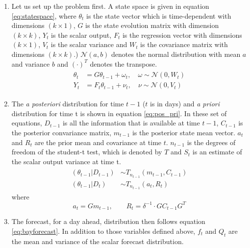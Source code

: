 \begin{enumerate}
\item Let us set up the problem first. A state space is given in equation \ref{eq:statespace}, where $\theta_t$ is the state vector which is time-dependent with dimensions $(k \times 1)$, $G$ is the state evolution matrix with dimension $(k \times k)$, $Y_t$ is the scalar output, $F_t$ is the regression vector with dimensions $(k \times 1)$, $V_t$ is the scalar variance and $W_t$ is the covariance matrix with dimensions $(k \times k)$.) $\mathscr{N}(a,b)$ denotes the normal distribution with mean $a$ and variance $b$ and $(\cdot)^T$ denotes the transpose.
\begin{align} \label{eq:statespace}
\begin{split}
\theta_t &= G\theta_{t-1} + \omega_t, \quad \omega \sim \mathscr{N}(0,W_t) \\
Y_t &= F_t\theta_{t-1} + \nu_t, \quad \nu \sim \mathscr{N}(0,V_t)
\end{split}
\end{align}
%
\item The \textit{a posteriori} distribution for time $t-1$ ($t$ is in days) and \textit{a priori} distribution for time t is shown in equation \ref{eq:pos_pri}. In these set of equations, $D_{t-1}$ is all the information that is available at time $t-1$, $C_{t-1}$ is the posterior convariance matrix, $m_{t-1}$ is the posterior state mean vector. $a_t$ and $R_t$ are the prior mean and covariance at time $t$. $n_{t-1}$ is the degrees of freedom of the student-t test, which is denoted by $T$ and $S_t$ is an estimate of the scalar output variance at time t.
%
\begin{align} \label{eq:pos_pri}
\begin{split}
(\theta_{t-1}|D_{t-1}) &\sim T_{n_{t-1}}(m_{t-1},C_{t-1}) \\
(\theta_{t-1}| D_t) &\sim T_{n_{t-1}}(a_t,R_t)
\end{split}
\end{align}
%
where
%
\begin{equation*}
a_t = Gm_{t-1}, \qquad R_t = \delta^{-1} \cdot GC_{t-1}G^T
\end{equation*}
%
\item The forecast, for a day ahead, distribution then follows equation \ref{eq:bayforecast}. In addition to those variables defined above, $f_t$ and $Q_t$ are the mean and variance of the scalar forecast distribution.
%
\begin{align} \label{eq:bayforecast}
\begin{split}

\end{split}
\end{align}
\end{enumerate}
